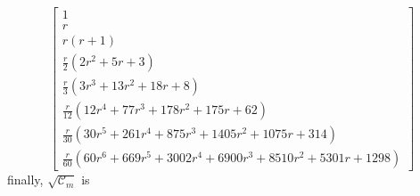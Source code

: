 \begin{displaymath}
\left[\begin{matrix}1 \\r \\r \left(r + 1\right) \\\frac{r}{2} \left(2 r^{2} + 5 r + 3\right) \\\frac{r}{3} \left(3 r^{3} + 13 r^{2} + 18 r + 8\right) \\\frac{r}{12} \left(12 r^{4} + 77 r^{3} + 178 r^{2} + 175 r + 62\right) \\\frac{r}{30} \left(30 r^{5} + 261 r^{4} + 875 r^{3} + 1405 r^{2} + 1075 r + 314\right) \\\frac{r}{60} \left(60 r^{6} + 669 r^{5} + 3002 r^{4} + 6900 r^{3} + 8510 r^{2} + 5301 r + 1298\right) \end{matrix}\right]
\end{displaymath}
finally, $\sqrt{\mathcal{C}_{m}}$ is
